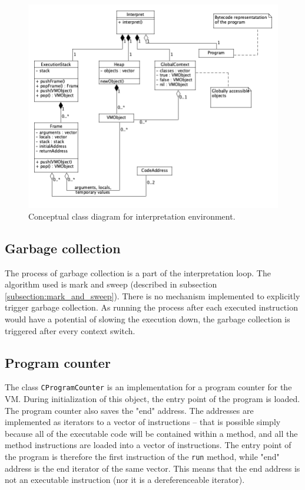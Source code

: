 \documentclass[thesis=M,english]{FITthesis}[2019/12/23]
\begin{document}
\begin{figure}[h!]
	\centering
	\includegraphics[width=\textwidth]{media/interpret_class.png}
	\caption{Conceptual class diagram for interpretation environment.}
	\label{fig:interpret_classDiagram}
\end{figure}

\subsection{Garbage collection}
The process of garbage collection is a part of the interpretation loop. The algorithm used is mark and sweep (described in subsection \ref{subsection:mark_and_sweep}).
There is no mechanism implemented to explicitly trigger garbage collection. As running the process after each executed instruction would
have a potential of slowing the execution down, the garbage collection is triggered after every context switch. 

\subsection{Program counter}
The class \texttt{CProgramCounter} is an implementation for a program counter for the VM. During initialization of this object, the entry point of the program is loaded.
The program counter also saves the "end" address. The addresses are implemented as iterators to a vector of instructions -- that is possible simply because all of the
executable code will be contained within a method, and all the method instructions are loaded into a vector of instructions. The entry point of the program is therefore the first
instruction of the \texttt{run} method, while "end" address is the end iterator of the same vector. This means that the end address is not an executable instruction
(nor it is a dereferenceable iterator).
\end{document}
